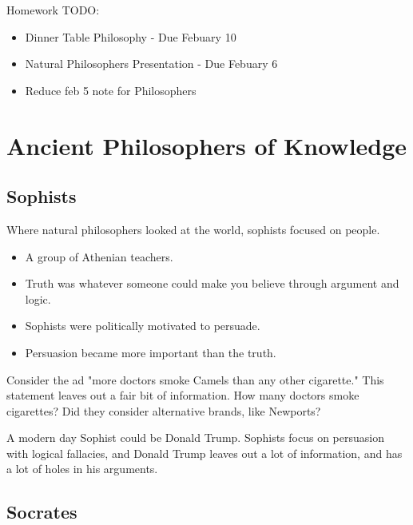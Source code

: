 

Homework TODO:
\begin{itemize}
    \item Dinner Table Philosophy - Due Febuary 10
    \item Natural Philosophers Presentation - Due Febuary 6
    \item Reduce feb 5 note for Philosophers
\end{itemize}

\section{Ancient Philosophers of Knowledge}

\subsection{Sophists}

Where natural philosophers looked at the world, sophists focused on people.

\begin{itemize}
    \item A group of Athenian teachers.
    \item Truth was whatever someone could make you believe through argument and logic.
    \item Sophists were politically motivated to persuade.
    \item Persuasion became more important than the truth.
\end{itemize}

Consider the ad "more doctors smoke Camels than any other cigarette."
This statement leaves out a fair bit of information. How many doctors smoke cigarettes?
Did they consider alternative brands, like Newports? 

A modern day Sophist could be Donald Trump. Sophists focus on persuasion with logical fallacies, 
and Donald Trump leaves out a lot of information, and has a lot of holes in his arguments.

\subsection{Socrates}

